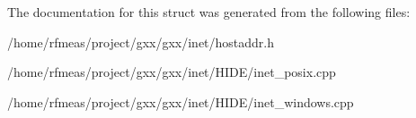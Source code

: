 The documentation for this struct was generated from the following files\+:\begin{DoxyCompactItemize}
\item 
/home/rfmeas/project/gxx/gxx/inet/hostaddr.\+h\item 
/home/rfmeas/project/gxx/gxx/inet/\+H\+I\+D\+E/inet\+\_\+posix.\+cpp\item 
/home/rfmeas/project/gxx/gxx/inet/\+H\+I\+D\+E/inet\+\_\+windows.\+cpp\end{DoxyCompactItemize}
